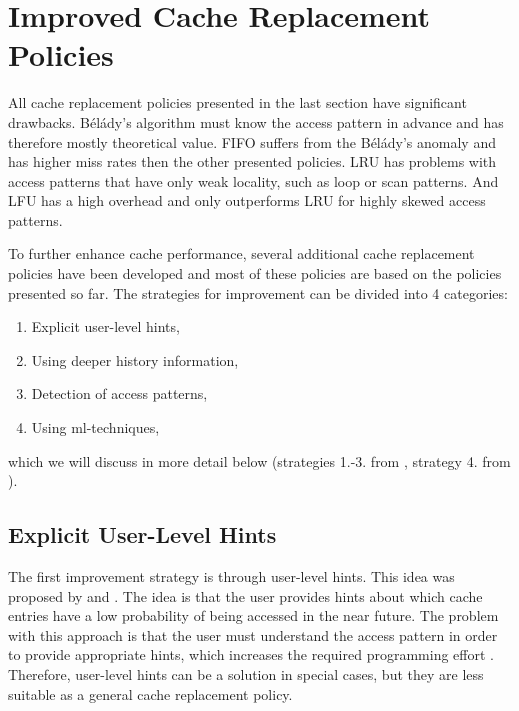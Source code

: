 \documentclass[
	12pt,
	a4paper,
	abstract,
	bibliography=totoc,
	chapterprefix,
	headings=openright,
	numbers=endperiod,
	parskip=half,
	twoside,
]{scrreprt}
\begin{document}
\section{Improved Cache Replacement Policies}
\label{sec:improved cache replacement policies}

All cache replacement policies presented in the last section have significant drawbacks.
Bélády's algorithm must know the access pattern in advance and has therefore mostly theoretical value.
FIFO suffers from the Bélády's anomaly and has higher miss rates then the other presented policies.
LRU has problems with access patterns that have only weak locality, such as loop or scan patterns.
And LFU has a high overhead and only outperforms LRU for highly skewed access patterns. 

To further enhance cache performance, several additional cache replacement policies have been developed and
most of these policies are based on the policies presented so far.
The strategies for improvement can be divided into 4 categories:

\begin{enumerate}
	\setlength\itemsep{-0.8em}
	\item Explicit user-level hints,
	\item Using deeper history information,
	\item Detection of access patterns,
	\item Using ml-techniques,
\end{enumerate}

which we will discuss in more detail below 
(strategies 1.-3. from \cite{10.1145/511399.511340}, strategy 4. from \cite{rodriguez2021learning}).


\subsection{Explicit User-Level Hints}

The first improvement strategy is through user-level hints.
This idea was proposed by \cite{cao1994application} and \cite{patterson1995informed}.
The idea is that the user provides hints about which cache entries have a low probability of being accessed in the near future.
The problem with this approach is that the user must understand the access pattern in order to provide appropriate hints, which increases 
the required programming effort \cite{10.1145/511399.511340}.
Therefore, user-level hints can be a solution in special cases,
but they are less suitable as a general cache replacement policy.
\end{document}
